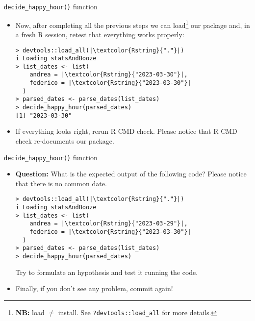 \documentclass[
hyperref={bookmarks=false},
xcolor={dvipsnames,svgnames*,x11names*}, 
12pt
]{beamer}
\begin{document}
\begin{frame}[fragile]{\texttt{decide\_happy\_hour()} function}
\vspace{-0.5cm}
\begin{itemize}
\itemsep 2ex
\item Now, after completing all the previous steps we can load\footnote{\textbf{NB:} load $\ne$ install. See \texttt{?devtools::load\_all} for more details.} our package and, in a fresh R session, retest that everything works properly: 
\begin{lstlisting}
> devtools::load_all(|\textcolor{Rstring}{"."}|)
i Loading statsAndBooze
> list_dates <- list(
    andrea = |\textcolor{Rstring}{"2023-03-30"}|, 
    federico = |\textcolor{Rstring}{"2023-03-30"}|
  )
> parsed_dates <- parse_dates(list_dates)
> decide_happy_hour(parsed_dates)
[1] "2023-03-30"
\end{lstlisting}
\item If everything looks right, rerun R CMD check. Please notice that R CMD check re-documents our package. 
\end{itemize}
\end{frame}

\begin{frame}[fragile]{\texttt{decide\_happy\_hour()} function}
\vspace{-0.5cm}
\begin{itemize}
\itemsep 2ex
\item \textbf{Question:} What is the expected output of the following code? Please notice that there is no common date.  
\begin{lstlisting}
> devtools::load_all(|\textcolor{Rstring}{"."}|)
i Loading statsAndBooze
> list_dates <- list(
    andrea = |\textcolor{Rstring}{"2023-03-29"}|, 
    federico = |\textcolor{Rstring}{"2023-03-30"}|
  )
> parsed_dates <- parse_dates(list_dates)
> decide_happy_hour(parsed_dates)
\end{lstlisting}
Try to formulate an hypothesis and test it running the code. 
\item Finally, if you don't see any problem, commit again! 
\end{itemize}
\end{frame}
\end{document}
